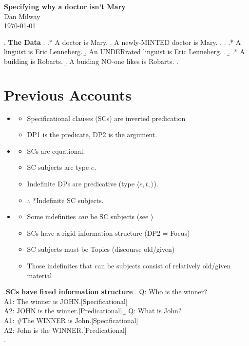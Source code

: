 \documentclass[GPFinal]{subfiles}
\begin{document}
\begin{center}
  \textbf{Specifying why a doctor isn't Mary}\\
  Dan Milway\\
  \today
\end{center}
\ex. \textbf{The Data}
\a.
\a.* A doctor is Mary.
\b. A newly-MINTED doctor is Mary.
\z.
\b.
\a.* A linguist is Eric Lenneberg.
\b. An UNDERrated linguist is Eric Lenneberg.
\z.
\b.
\a.* A building is Robarts.
\b. A buiding NO-one likes is Robarts.
\z.

\section{Previous Accounts}
\begin{itemize}
  \item \textcite{moro1997raising}
    \begin{itemize}
      \item Specificational clauses (SCs) are inverted predication
      \item DP1 is the predicate, DP2 is the argument.
    \end{itemize}
  \item \textcite{heycockkroch1999pseudocleft}
    \begin{itemize}
      \item SCs are equational.
      \item SC subjects are type $e$.
      \item Indefinite DPs are predicative (type $\langle e,t,\rangle$).
      \item $\therefore$ *Indefinite SC subjects.
    \end{itemize}
  \item \textcite{mikkelsen2004specifying}
    \begin{itemize}
      \item Some indefinites \textit{can} be SC subjects (see \Last)
      \item SCs have a rigid information structure (DP2 = Focus)
    \end{itemize}
    \begin{itemize}
      \item SC subjects must be Topics (discourse old/given)
      \item Those indefinites that can be subjects consist of relatively old/given material
    \end{itemize}
\end{itemize}
\ex.\label{ex:MikkIS}\textbf{SCs have fixed information structure}
\a. Q: Who is the winner?\\
A1: The winner is JOHN.\hfill[Specificational]\\
A2: JOHN is the winner.\hfill[Predicational]
\b. Q: What is John?\\
A1: \#The WINNER is John.\hfill[Specificational]\\
A2: John is the WINNER.\hfill[Predicational]\\
\z.
\end{document}
